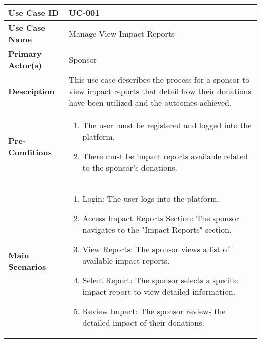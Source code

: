 \begin{table}[!ht]
    \centering
    \renewcommand{\arraystretch}{1.3} %
    \begin{tabularx}{\textwidth}{|l|X|}
        \hline
        \textbf{Use Case ID} & UC-001 \\
        \hline
        \textbf{Use Case Name} & Manage View Impact Reports \\
        \hline
        \textbf{Primary Actor(s)} & Sponsor \\
        \hline
        \textbf{Description} &  This use case describes the process for a sponsor to view impact reports that detail how their donations have been utilized and the outcomes achieved.\\
        \hline
        \textbf{Pre-Conditions} & 
        \begin{enumerate}[label=\arabic*.,itemsep=0pt]
            \item The user must be registered and logged into the platform.
            \item There must be impact reports available related to the sponsor's donations.
        \end{enumerate} \\
        \hline
        \textbf{Main Scenarios} & 
        \begin{enumerate}[label=\arabic*.,itemsep=0pt]
            \item Login: The user logs into the platform.
            \item Access Impact Reports Section: The sponsor navigates to the "Impact Reports" section.
            \item View Reports: The sponsor views a list of available impact reports.
            \item Select Report: The sponsor selects a specific impact report to view detailed information.
            \item Review Impact: The sponsor reviews the detailed impact of their donations.
        \end{enumerate} \\
        

\end{tabularx}
\end{table}
